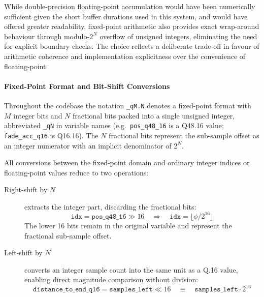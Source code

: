 While double-precision floating-point accumulation would have been numerically sufficient given the short buffer durations used in this system, and would have offered greater readability, fixed-point arithmetic also provides exact wrap-around behaviour through modulo-$2^N$ overflow of unsigned integers, eliminating the need for explicit boundary checks. The choice reflects a deliberate trade-off in favour of arithmetic coherence and implementation explicitness over the convenience of floating-point.


\paragraph{Fixed-Point Format and Bit-Shift Conversions}
\label{sec:fixed-point-shifts}

Throughout the codebase the notation \texttt{\_qM.N} denotes a fixed-point format with $M$ integer bits and $N$ fractional bits packed into a single unsigned integer, abbreviated \texttt{\_qN} in variable names (e.g.\ \texttt{pos\_q48\_16} is a Q48.16 value; \texttt{fade\_acc\_q16} is Q16.16).
The $N$ fractional bits represent the sub-sample offset as an integer numerator with an implicit denominator of $2^N$.

All conversions between the fixed-point domain and ordinary integer indices or floating-point values reduce to two operations:

\begin{description}
	\item[Right-shift by $N$] extracts the integer part, discarding the fractional bits:
	\[
	\texttt{idx} = \texttt{pos\_q48\_16} \gg 16
	\quad \Longrightarrow \quad
	\texttt{idx} = \lfloor \phi / 2^{16} \rfloor
	\]
	The lower 16 bits remain in the original variable and represent the fractional sub-sample offset.
	
	\item[Left-shift by $N$] converts an integer sample count into the same unit as a Q.16 value, enabling direct magnitude comparison without division:
	\[
	\texttt{distance\_to\_end\_q16} = \texttt{samples\_left} \ll 16
	\quad \equiv \quad
	\texttt{samples\_left} \cdot 2^{16}
	\]
\end{description}



